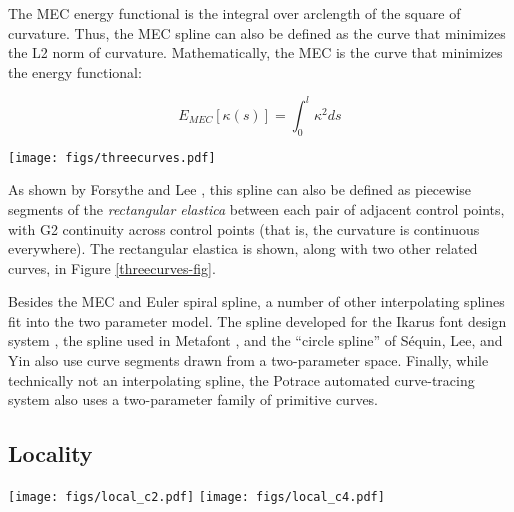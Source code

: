 \documentclass{article}
\begin{document}
The MEC energy functional is the integral over arclength of the square
of curvature. Thus, the MEC spline can also be defined as the curve
that minimizes the L2 norm of curvature. Mathematically, the MEC is
the curve that minimizes the energy functional:

\begin{equation}
E_{MEC}[\kappa(s)] = \int_0^l \kappa^2 ds
\end{equation}

\begin{figure*}[ht]
\begin{center}
\texttt{[image: figs/threecurves.pdf]}
\caption{\label{threecurves-fig}Euler's spiral, rectangular elastica,
  and cubic parabola.}
\end{center}
\end{figure*}

As shown by Forsythe and Lee \cite{ForsytheLee}, this spline can also
be defined as piecewise segments of the \emph{rectangular elastica}
between each pair of adjacent control points, with G2 continuity
across control points (that is, the curvature is continuous
everywhere). The rectangular elastica is shown, along with two other
related curves, in Figure \ref{threecurves-fig}.


Besides the MEC and Euler spiral spline, a number of other
interpolating splines fit into the two parameter model. The spline
developed for the Ikarus font design system \cite{Karow87}, the spline
used in Metafont \cite{Hobby85}, and the ``circle spline'' of
S\'equin, Lee, and Yin \cite{DBLP:journals/cad/SequinLY05} also use
curve segments drawn from a two-parameter space. Finally, while
technically not an interpolating spline, the Potrace automated
curve-tracing system \cite{Selinger03} also uses a two-parameter
family of primitive curves.

\subsection{Locality}

\begin{figure*}[tbh]
\begin{center}
\texttt{[image: figs/local\_c2.pdf]}
\texttt{[image: figs/local\_c4.pdf]}
\caption{\label{props-locality}$G^2$ spline has better locality than $G^4$.}
\end{center}
\end{figure*}
\end{document}
